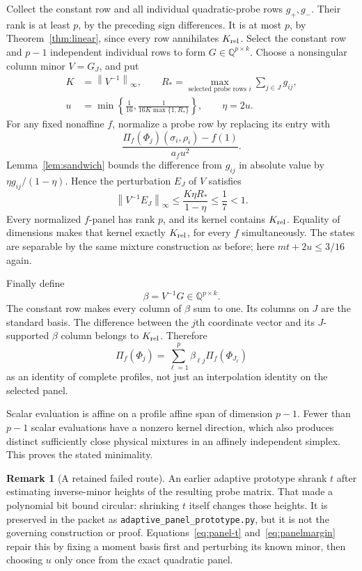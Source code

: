 \documentclass[11pt,a4paper]{article}
\theoremstyle{definition}\newtheorem{definition}[theorem]{Definition}
\newtheorem{remark}[theorem]{Remark}
\newcommand{\Q}{\mathbb Q}
\newcommand{\norm}[1]{\left\lVert #1\right\rVert}
\begin{document}
Collect the constant row and all individual quadratic-probe rows $g_+,g_-$. Their rank is at least $p$, by the preceding sign differences. It is at most $p$, by Theorem~\ref{thm:linear}, since every row annihilates $K_{\rm rel}$. Select the constant row and $p-1$ independent individual rows to form $G\in\Q^{p\times k}$. Choose a nonsingular column minor $V=G_J$, and put
\begin{align*}
 K&=\norm{V^{-1}}_{\infty},\qquad
 R_* =\max_{\text{selected probe rows }i}\sum_{j\in J} g_{ij},\\
 u&=\min\left\{\frac1{16},\frac1{16K\max\{1,R_*\}}\right\},\qquad\eta=2u.
\end{align*}
For any fixed nonaffine $f$, normalize a probe row by replacing its entry with
\[
 \frac{\Pi_f(\Phi_j)(\sigma_i,\rho_i)-f(1)}{a_fu^2}.
\]
Lemma~\ref{lem:sandwich} bounds the difference from $g_{ij}$ in absolute value by $\eta g_{ij}/(1-\eta)$. Hence the perturbation $E_J$ of $V$ satisfies
\begin{equation}\label{eq:panelmargin}
 \norm{V^{-1}E_J}_{\infty}\le\frac{K\eta R_*}{1-\eta}\le\frac17<1.
\end{equation}
Every normalized $f$-panel has rank $p$, and its kernel contains $K_{\rm rel}$. Equality of dimensions makes that kernel exactly $K_{\rm rel}$, for every $f$ simultaneously. The states are separable by the same mixture construction as before; here $mt+2u\le3/16$ again.

Finally define
\begin{equation}\label{eq:beta}
 \beta=V^{-1}G\in\Q^{p\times k}.
\end{equation}
The constant row makes every column of $\beta$ sum to one. Its columns on $J$ are the standard basis. The difference between the $j$th coordinate vector and its $J$-supported $\beta$ column belongs to $K_{\rm rel}$. Therefore
\[
 \Pi_f(\Phi_j)=\sum_{\ell=1}^p\beta_{\ell j}\Pi_f(\Phi_{J_\ell})
\]
as an identity of complete profiles, not just an interpolation identity on the selected panel.

Scalar evaluation is affine on a profile affine span of dimension $p-1$. Fewer than $p-1$ scalar evaluations have a nonzero kernel direction, which also produces distinct sufficiently close physical mixtures in an affinely independent simplex. This proves the stated minimality.

\begin{remark}[A retained failed route]
An earlier adaptive prototype shrank $t$ after estimating inverse-minor heights of the resulting probe matrix. That made a polynomial bit bound circular: shrinking $t$ itself changes those heights. It is preserved in the packet as \texttt{adaptive\_panel\_prototype.py}, but it is not the governing construction or proof. Equations~\eqref{eq:panel-t} and~\eqref{eq:panelmargin} repair this by fixing a moment basis first and perturbing its known minor, then choosing $u$ only once from the exact quadratic panel.
\end{remark}
\end{document}
